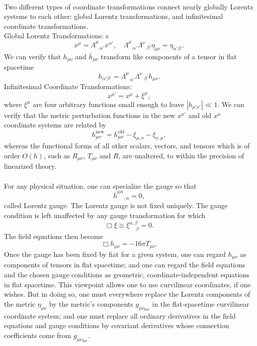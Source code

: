 \documentclass[cyan]{elegantnote}
\begin{document}
\\
Two different types of coordinate transformations connect nearly globally Lorentz systems to each other: global Lorentz transformations, and infinitesimal coordinate
transformations.
\\
Global Lorentz Transformations:
s\\
\[x^{\mu} = \Lambda^{\mu}_{\phantom{*}\alpha'}x^{\alpha'} , \quad \Lambda^{\mu}_{\phantom{*}\alpha'} \Lambda^{\nu}_{\phantom{*}\beta'} \eta_{\mu\nu} = \eta_{\alpha'\beta'} .\]
We can verify that $h_{\mu\nu}$ and $\bar{h}_{\mu\nu}$
transform like components of a tensor in flat spacetime
\[h_{\alpha'\beta'} = \Lambda^{\mu}_{\phantom{*}\alpha'} \Lambda^{\nu}_{\phantom{*}\beta'} h_{\mu\nu}.\]
Infinitesimal Coordinate Transformations:
\\
\[x^{\mu'} = x^{\mu} + \xi^{\mu},\]
where $\xi^{\mu}$ are four arbitrary functions small enough to leave $|h_{\mu'\nu'}| \ll 1$. We can verify that the metric perturbation functions in the new $x^{\mu'}$ and old $x^{\mu}$ coordinate systems are related by
\[h_{\mu\nu}^{\mathrm{new}} = h_{\mu\nu}^{\mathrm{old}} - \xi_{\mu,\nu} - \xi_{\nu,\mu},\]
whereas the functional forms of all other scalars, vectors, and tensors which is of order $O(h)$, such as $R_{\mu\nu}$, $T_{\mu\nu}$ and $R$, are unaltered, to within the precision of linearized theory. 
\\ \\
For any physical situation, one can specialize the gauge so that
\[\overline{h}^{\mu\alpha}_{\phantom{**},\alpha} = 0,\] 
called Lorentz gauge. 
The Lorentz gauge is not fixed uniquely. The gauge condition is left unaffected by any gauge transformation for which
\[\Box \xi \equiv \xi^{\alpha,\beta}_{\phantom{**}\beta} = 0.\]
The field equations then become
\[\Box h_{\mu\nu} = -16\pi T_{\mu\nu}.\]
Once the gauge has been fixed by fiat for a given system, one can regard $h_{\mu\nu}$ as components of tensors in flat spacetime; and one can regard the field equations and the chosen gauge conditions as geometric, coordinate-independent equations in flat spacetime.
This viewpoint allows one to use curvilinear coordinates, if one wishes. But in doing so, one must everywhere replace the Lorentz components of the metric $\eta_{\mu\nu}$ by the metric's components $g_{\mu\nu_{\mathrm{flat}}}$ in the flat-spacetime curvilinear coordinate system; and one must replace all ordinary derivatives in the field equations and gauge conditions by covariant derivatives whose connection coefficients come from $g_{\mu\nu_{\mathrm{flat}}}$.
\end{document}
